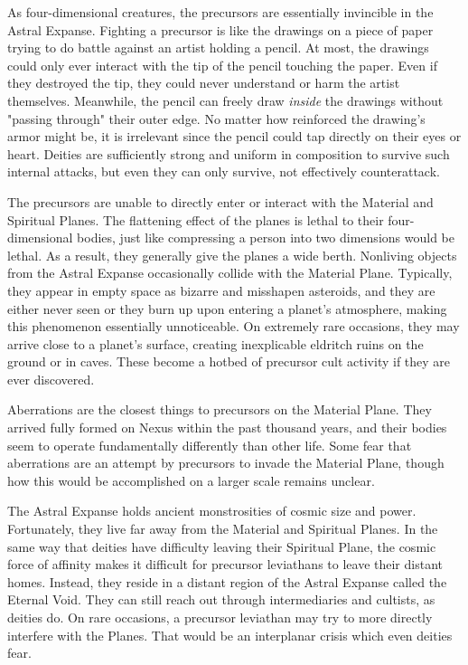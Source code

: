   As four-dimensional creatures, the precursors are essentially invincible in the Astral Expanse.
  Fighting a precursor is like the drawings on a piece of paper trying to do battle against an artist holding a pencil.
  At most, the drawings could only ever interact with the tip of the pencil touching the paper.
  Even if they destroyed the tip, they could never understand or harm the artist themselves.
  Meanwhile, the pencil can freely draw \textit{inside} the drawings without "passing through" their outer edge.
  No matter how reinforced the drawing's armor might be, it is irrelevant since the pencil could tap directly on their eyes or heart.
  Deities are sufficiently strong and uniform in composition to survive such internal attacks, but even they can only survive, not effectively counterattack.

  The precursors are unable to directly enter or interact with the Material and Spiritual Planes.
  The flattening effect of the planes is lethal to their four-dimensional bodies, just like compressing a person into two dimensions would be lethal.
  As a result, they generally give the planes a wide berth.
  Nonliving objects from the Astral Expanse occasionally collide with the Material Plane.
  Typically, they appear in empty space as bizarre and misshapen asteroids, and they are either never seen or they burn up upon entering a planet's atmosphere, making this phenomenon essentially unnoticeable.
  On extremely rare occasions, they may arrive close to a planet's surface, creating inexplicable eldritch ruins on the ground or in caves.
  These become a hotbed of precursor cult activity if they are ever discovered.

  Aberrations are the closest things to precursors on the Material Plane.
  They arrived fully formed on Nexus within the past thousand years, and their bodies seem to operate fundamentally differently than other life.
  Some fear that aberrations are an attempt by precursors to invade the Material Plane, though how this would be accomplished on a larger scale remains unclear.

  The Astral Expanse holds ancient monstrosities of cosmic size and power.
  Fortunately, they live far away from the Material and Spiritual Planes.
  In the same way that deities have difficulty leaving their Spiritual Plane, the cosmic force of affinity makes it difficult for precursor leviathans to leave their distant homes.
  Instead, they reside in a distant region of the Astral Expanse called the Eternal Void.
  They can still reach out through intermediaries and cultists, as deities do.
  On rare occasions, a precursor leviathan may try to more directly interfere with the Planes.
  That would be an interplanar crisis which even deities fear.
